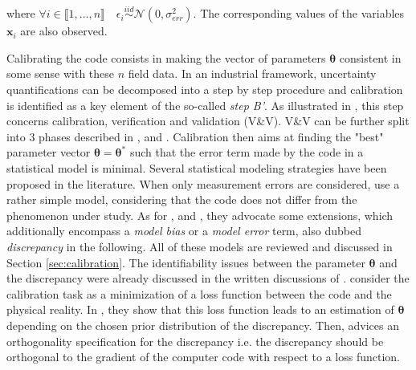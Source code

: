 \documentclass[soumission]{jsfds}
\begin{document}
where $\forall i \in \llbracket1,\dots,n\rrbracket \quad \epsilon_i\overset{iid}{\sim} \mathcal{N}(0,\sigma_{err}^2)$. The corresponding values of the variables $\boldsymbol{x}_i$ are also observed.
\newline

Calibrating the code consists
in making the vector of parameters $\boldsymbol{\theta}$ consistent in some sense with these $n$ field data. In an industrial framework, uncertainty quantifications \citep{rocquigny2009quantifying} can be decomposed into a step by step procedure and calibration is identified as a key element of the so-called \textit{step B'}. As illustrated in \citet{damblin2015}, this step concerns calibration,
verification and validation (V\&V). V\&V can be further split into 3 phases  described in \citet{roache1998}, \citet{bayarri2007} and \citet{oberkampf1998}.
Calibration then aims at finding the "best" parameter vector $\boldsymbol{\theta}=\boldsymbol{\theta}^*$ such that the error term made by the
code in a statistical model is minimal. Several statistical modeling strategies have been proposed in the literature. When only measurement errors
are considered, \citet{cox2001} use a rather simple model, considering that the code does not differ from the phenomenon under study. As for
\citet{higdon2004}, \citet{kennedy2001} and \citet{bayarri2007},  they advocate some extensions, which additionally encompass a \textit{model bias} 
or a \textit{model error} term, also dubbed \textit{discrepancy} in the following. All of these models are reviewed and discussed in Section
\ref{sec:calibration}. The identifiability issues between the parameter $\boldsymbol{\theta}$ and the discrepancy were already discussed in the written discussions of \citet{kennedy2001}. \citet{tuo2015efficient} consider the calibration task as a minimization of a loss function between the code and the physical reality. 
In \citet{tuo2016theoretical}, 
they show that this loss function leads to an estimation of $\boldsymbol{\theta}$ depending on the chosen prior distribution of the discrepancy. Then,  \citet{plumlee2017} advices an orthogonality 
specification for the discrepancy i.e. the discrepancy should be orthogonal to the gradient of the computer code with respect to a loss function.
\newline
\end{document}
